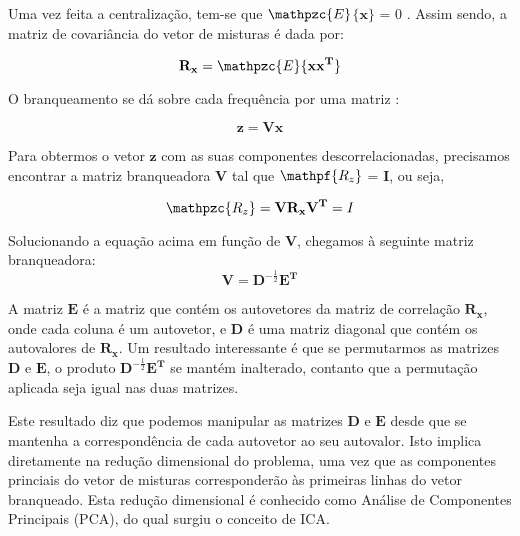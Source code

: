         Uma vez feita a centralização, tem-se que $\mathpzc{E}$$\{$$\mathbf{x}$$\}$ = 0 . Assim sendo, a matriz de covariância do vetor de misturas é dada por:
        
        \begin{equation}\label{eq:covariance}
            \mathbf{R_x} = \mathpzc{E}\{\mathbf{xx^T}\}
        \end{equation}
        
        O branqueamento se dá sobre cada frequência por uma matriz :
        
        \begin{equation}\label{eq:whiteningfrequency}
            \mathbf{z} = \mathbf{V}\mathbf{x}
        \end{equation}
        
        Para obtermos o vetor $\mathbf{z}$ com as suas componentes descorrelacionadas, precisamos encontrar a matriz branqueadora $\mathbf{V}$ tal que $\mathpf{R_z}$ = $\mathbf{I}$, ou seja,

        \begin{equation}
            \label{whiteningproof}
        \mathpzc{R_z} = \mathbf{V}\mathbf{R_x}\mathbf{V^T} = I 
        \end{equation}

        Solucionando a equação acima em função de $\mathbf{V}$, chegamos à seguinte matriz branqueadora:
        \begin{equation}\label{eq:vk}
            \mathbf{V} = \mathbf{D}^{-\frac{1}{2}}\mathbf{E^T}
        \end{equation}
        
        A matriz $\mathbf{E}$ é a matriz que contém os autovetores da matriz de correlação $\mathbf{R_x}$, onde cada coluna é um autovetor, e $\mathbf{D}$ é uma matriz diagonal que contém os autovalores de $\mathbf{R_x}$. Um resultado interessante é que se permutarmos as matrizes $\mathbf{D}$ e $\mathbf{E}$, o produto $\mathbf{D}^{-\frac{1}{2}}\mathbf{E^T}$ se mantém inalterado, contanto que a permutação aplicada seja igual nas duas matrizes.
        
        Este resultado diz que podemos manipular as matrizes $\mathbf{D}$ e $\mathbf{E}$ desde que se mantenha a correspondência de cada autovetor ao seu autovalor. Isto implica diretamente na redução dimensional do problema, uma vez que as componentes princiais do vetor de misturas corresponderão às primeiras linhas do vetor branqueado. Esta redução dimensional é conhecido como Análise de Componentes Principais (PCA), do qual surgiu o conceito de ICA. 
        

